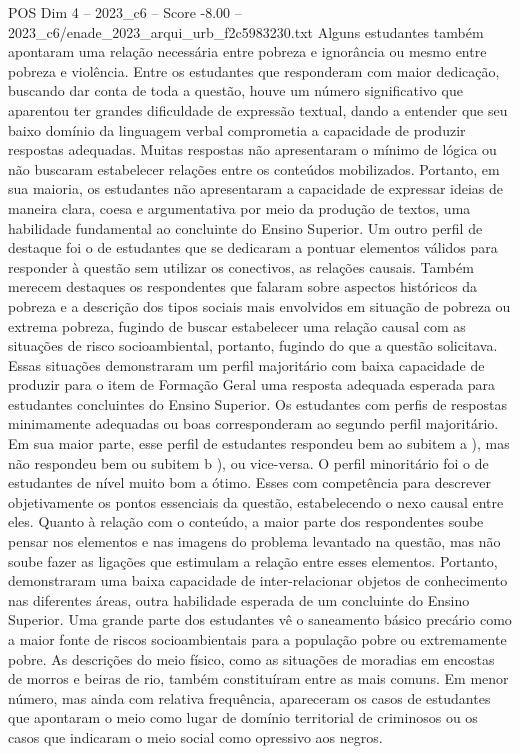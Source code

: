 \begin{textsample}{POS Dim 4 – 2023\_c6 – Score -8.00 – 2023\_c6/enade\_2023\_arqui\_urb\_f2c5983230.txt}
Alguns estudantes também apontaram uma relação necessária entre pobreza e ignorância ou mesmo entre pobreza e violência.
Entre os estudantes que responderam com maior dedicação, buscando dar conta de toda a questão, houve um número significativo que aparentou ter grandes dificuldade de expressão textual, dando a entender que seu baixo domínio da linguagem verbal comprometia a capacidade de produzir respostas adequadas.
Muitas respostas não apresentaram o mínimo de lógica ou não buscaram estabelecer relações entre os conteúdos mobilizados.
Portanto, em sua maioria, os estudantes não apresentaram a capacidade de expressar ideias de maneira clara, coesa e argumentativa por meio da produção de textos, uma habilidade fundamental ao concluinte do Ensino Superior.
Um outro perfil de destaque foi o de estudantes que se dedicaram a pontuar elementos válidos para responder à questão sem utilizar os conectivos, as relações causais.
Também merecem destaques os respondentes que falaram sobre aspectos históricos da pobreza e a descrição dos tipos sociais mais envolvidos em situação de pobreza ou extrema pobreza, fugindo de buscar estabelecer uma relação causal com as situações de risco socioambiental, portanto, fugindo do que a questão solicitava.
Essas situações demonstraram um perfil majoritário com baixa capacidade de produzir para o item de Formação Geral uma resposta adequada esperada para estudantes concluintes do Ensino Superior.
Os estudantes com perfis de respostas minimamente adequadas ou boas corresponderam ao segundo perfil majoritário.
Em sua maior parte, esse perfil de estudantes respondeu bem ao subitem a ), mas não respondeu bem ou subitem b ), ou vice-versa.
O perfil minoritário foi o de estudantes de nível muito bom a ótimo.
Esses com competência para descrever objetivamente os pontos essenciais da questão, estabelecendo o nexo causal entre eles.
Quanto à relação com o conteúdo, a maior parte dos respondentes soube pensar nos elementos e nas imagens do problema levantado na questão, mas não soube fazer as ligações que estimulam a relação entre esses elementos.
Portanto, demonstraram uma baixa capacidade de inter-relacionar objetos de conhecimento nas diferentes áreas, outra habilidade esperada de um concluinte do Ensino Superior.
Uma grande parte dos estudantes vê o saneamento básico precário como a maior fonte de riscos socioambientais para a população pobre ou extremamente pobre.
As descrições do meio físico, como as situações de moradias em encostas de morros e beiras de rio, também constituíram entre as mais comuns.
Em menor número, mas ainda com relativa frequência, apareceram os casos de estudantes que apontaram o meio como lugar de domínio territorial de criminosos ou os casos que indicaram o meio social como opressivo aos negros.

\end{textsample}
